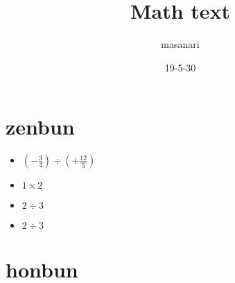 \documentclass[twocolumn, 17pt]{jsarticle}
\begin{document}
\title{Math text}
\author{masanari}

\date{19-5-30}

\section{zenbun}

\begin{itemize}
  \item \LARGE $ (-\frac{3}{4} )\div (+\frac{12}{5}) $
    \normalsize \newline
  \item  $ 1 \times 2 $
  \item $ 2 \div 3 $
  \item $ 2 \div 3 $
\end{itemize}
\newpage

\section{honbun}
\end{document}
